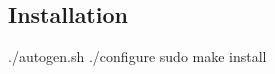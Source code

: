 \subsection*{Installation}


\begin{DoxyCode}
./autogen.sh
./configure
sudo make install
\end{DoxyCode}
 